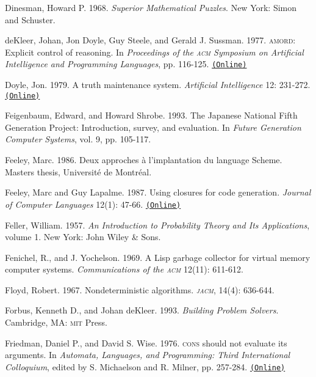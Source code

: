\documentclass[8pt,oneside]{book}
\newcommand{\acronym}[1]{\textsc{\MakeLowercase{#1}}}
\newcommand{\code}[1]{\texttt{#1}}
\begin{document}
 \label{Dinesman 1968}
Dinesman, Howard P.  1968.  \textit{Superior Mathematical Puzzles}.  New York:
Simon and Schuster.

 \label{deKleer et al. 1977}
deKleer, Johan, Jon Doyle, Guy Steele, and Gerald J. Sussman.  1977.
\acronym{AMORD}: Explicit control of reasoning.  In \textit{Proceedings of the
\acronym{ACM} Symposium on Artificial Intelligence and Programming Languages},
pp.  116-125.
\href{http://dspace.mit.edu/handle/1721.1/5750}{\code{(Online)}}

 \label{Doyle (1979)}
Doyle, Jon. 1979. A truth maintenance system. \textit{Artificial Intelligence}
12: 231-272.
\href{http://dspace.mit.edu/handle/1721.1/5733}{\code{(Online)}}

 \label{Feigenbaum and Shrobe 1993}
Feigenbaum, Edward, and Howard Shrobe. 1993. The Japanese National Fifth
Generation Project: Introduction, survey, and evaluation.  In \textit{Future
Generation Computer Systems}, vol. 9, pp. 105-117.

 \label{Feeley (1986)}
Feeley, Marc.  1986.  Deux approches \`a l'implantation du language
Scheme.  Masters thesis, Universit\'e de Montr\'eal.

 \label{Feeley and Lapalme 1987}
Feeley, Marc and Guy Lapalme.  1987.  Using closures for code generation.
\textit{Journal of Computer Languages} 12(1): 47-66.
\href{http://citeseerx.ist.psu.edu/viewdoc/summary?doi=10.1.1.90.6978}{\code{(Online)}}

Feller, William.  1957.  \textit{An Introduction to Probability Theory and Its
Applications}, volume 1. New York: John Wiley \& Sons.

 \label{Fenichel and Yochelson (1969)}
Fenichel, R., and J. Yochelson.  1969.  A Lisp garbage collector for virtual
memory computer systems.  \textit{Communications of the \acronym{ACM}}
12(11): 611-612.

 \label{Floyd (1967)}
Floyd, Robert. 1967. Nondeterministic algorithms. \textit{\acronym{JACM}},
14(4): 636-644.

 \label{Forbus and deKleer 1993}
Forbus, Kenneth D., and Johan deKleer.  1993. \textit{Building Problem
Solvers}. Cambridge, MA: \acronym{MIT} Press.

 \label{Friedman and Wise (1976)}
Friedman, Daniel P., and David S. Wise.  1976.  \acronym{CONS} should not
evaluate its arguments. In \textit{Automata, Languages, and Programming: Third
International Colloquium}, edited by S. Michaelson and R.  Milner, pp. 257-284.
\href{https://www.cs.indiana.edu/cgi-bin/techreports/TRNNN.cgi?trnum=TR44}{\code{(Online)}}
\end{document}
